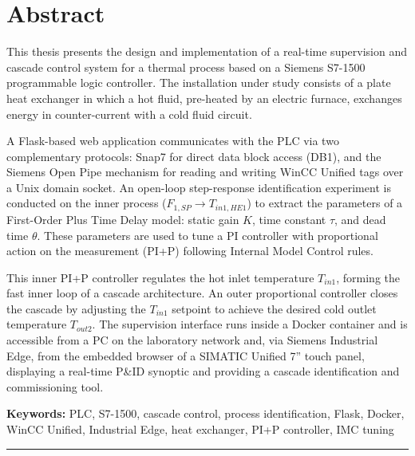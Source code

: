 \clearpage
\chapter*{Abstract}

\noindent
This thesis presents the design and implementation of a real-time supervision and cascade
control system for a thermal process based on a Siemens S7-1500 programmable logic
controller. The installation under study consists of a plate heat exchanger in which a hot
fluid, pre-heated by an electric furnace, exchanges energy in counter-current with a cold
fluid circuit.

A Flask-based web application communicates with the PLC via two complementary protocols:
Snap7 for direct data block access (DB1), and the Siemens Open Pipe mechanism for reading
and writing WinCC Unified tags over a Unix domain socket. An open-loop step-response
identification experiment is conducted on the inner process
($F_{1,SP} \rightarrow T_{in1,HE1}$) to extract the parameters of a First-Order Plus Time
Delay model: static gain $K$, time constant $\tau$, and dead time $\theta$. These parameters
are used to tune a PI controller with proportional action on the measurement (PI+P) following
Internal Model Control rules.

This inner PI+P controller regulates the hot inlet temperature $T_{in1}$, forming the fast
inner loop of a cascade architecture. An outer proportional controller closes the cascade by
adjusting the $T_{in1}$ setpoint to achieve the desired cold outlet temperature $T_{out2}$.
The supervision interface runs inside a Docker container and is accessible from a PC on the
laboratory network and, via Siemens Industrial Edge, from the embedded browser of a SIMATIC
Unified 7'' touch panel, displaying a real-time P\&ID synoptic
and providing a cascade identification and commissioning tool.

\medskip
\noindent\textbf{Keywords:} PLC, S7-1500, cascade control, process identification, Flask,
Docker, WinCC Unified, Industrial Edge, heat exchanger, PI+P controller, IMC tuning

\bigskip
\hrule
\bigskip

